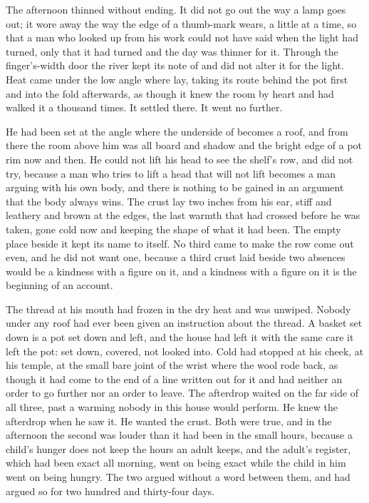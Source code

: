 The afternoon thinned without ending. It did not go out the way a lamp goes out; it wore away the way the edge of a thumb-mark wears, a little at a time, so that a man who looked up from his work could not have said when the light had turned, only that it had turned and the day was thinner for it. Through the finger's-width door the river kept its note of  and did not alter it for the light. Heat came under the low angle where  lay, taking its route behind the pot first and into the fold afterwards, as though it knew the room by heart and had walked it a thousand times. It settled there. It went no further.

He had been set at the angle where the underside of  becomes a roof, and from there the room above him was all board and shadow and the bright edge of a pot rim now and then. He could not lift his head to see the shelf's row, and did not try, because a man who tries to lift a head that will not lift becomes a man arguing with his own body, and there is nothing to be gained in an argument that the body always wins. The crust lay two inches from his ear, stiff and leathery and brown at the edges, the last warmth that had crossed  before he was taken, gone cold now and keeping the shape of what it had been. The empty place beside it kept its name to itself. No third came to make the row come out even, and he did not want one, because a third crust laid beside two absences would be a kindness with a figure on it, and a kindness with a figure on it is the beginning of an account.

The thread at his mouth had frozen in the dry heat and was unwiped. Nobody under any roof had ever been given an instruction about the thread. A basket set down is a pot set down and left, and the house had left it with the same care it left the pot: set down, covered, not looked into. Cold had stopped at his cheek, at his temple, at the small bare joint of the wrist where the wool rode back, as though it had come to the end of a line written out for it and had neither an order to go further nor an order to leave. The afterdrop waited on the far side of all three, past a warming nobody in this house would perform. He knew the afterdrop when he saw it. He wanted the crust. Both were true, and in the afternoon the second was louder than it had been in the small hours, because a child's hunger does not keep the hours an adult keeps, and the adult's register, which had been exact all morning, went on being exact while the child in him went on being hungry. The two argued without a word between them, and had argued so for two hundred and thirty-four days.

